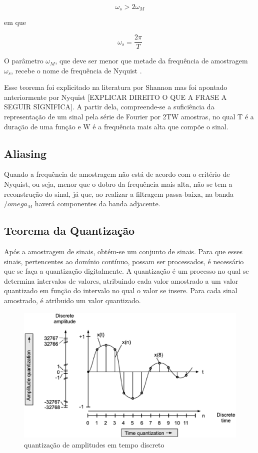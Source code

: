 \begin{equation} \label{eq:01}
\omega_s>2\omega_M
\end{equation}

em que

\begin{equation} \label{eq:02}
\omega_s=\frac{2\pi}{T}
\end{equation}

O parâmetro $\omega_M$, que deve ser menor que metade da frequência de amostragem  $\omega_s$, recebe o nome de frequência de Nyquist \cite{oppenheim2010sinais}.
\par
Esse teorema foi explicitado na literatura por Shannon \cite{Shannon} mas foi apontado anteriormente por Nyquist \cite{nyquist} [EXPLICAR DIREITO O QUE A FRASE A SEGUIR SIGNIFICA]. A partir dela, compreende-se a suficiência da representação de um sinal pela série de Fourier por 2TW amostras, no qual T é a duração de uma função e W é a frequência mais alta que compõe o sinal.

\subsection{Aliasing}
Quando a frequência de amostragem não está de acordo com o critério de Nyquist, ou seja, menor que o dobro da frequência mais alta, não se tem a reconstrução do sinal, já que, ao realizar a filtragem passa-baixa, na banda $/omega_M$ haverá componentes da banda adjacente.

\subsection{Teorema da Quantização}

Após a amostragem de sinais, obtém-se um conjunto de sinais. Para que esses sinais, pertencentes ao domínio contínuo, possam ser processados, é necessário que se faça a quantização digitalmente. A quantização é um processo no qual se determina intervalos de valores, atribuindo cada valor amostrado a um valor quantizado em função do intervalo no qual o valor se insere. Para cada sinal amostrado, é atribuido um valor quantizado.

\begin{figure}[h]
	\centering
    \includegraphics[scale=0.4]{figuras/fig04.eps}
	\caption{quantização de amplitudes em tempo discreto}
	\label{fig04}
\end{figure}

